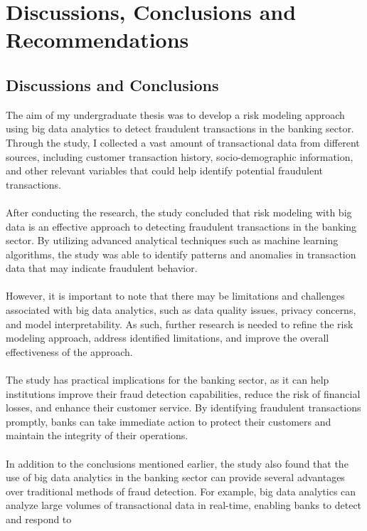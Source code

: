 \chapter{Discussions, Conclusions and Recommendations}

\section{Discussions and Conclusions}

The aim of my undergraduate thesis was to develop a risk modeling approach using big data analytics to detect 
fraudulent transactions in the banking sector. Through the study, I collected a vast amount of transactional data 
from different sources, including customer transaction history, socio-demographic information, and other relevant 
variables that could help identify potential fraudulent transactions.\\\\
After conducting the research, the study concluded that risk modeling with big data is an effective approach to 
detecting fraudulent transactions in the banking sector. By utilizing advanced analytical techniques such as 
machine learning algorithms, the study was able to identify patterns and anomalies in transaction data that may 
indicate fraudulent behavior.\\\\
However, it is important to note that there may be limitations and challenges associated with big data analytics, 
such as data quality issues, privacy concerns, and model interpretability. As such, further research is needed to 
refine the risk modeling approach, address identified limitations, and improve the overall effectiveness of the 
approach.\\\\
The study has practical implications for the banking sector, as it can help institutions improve their fraud 
detection capabilities, reduce the risk of financial losses, and enhance their customer service. By identifying 
fraudulent transactions promptly, banks can take immediate action to protect their customers and maintain the 
integrity of their operations.\\\\
In addition to the conclusions mentioned earlier, the study also found that the use of big data analytics in the 
banking sector can provide several advantages over traditional methods of fraud detection. For example, big data 
analytics can analyze large volumes of transactional data in real-time, enabling banks to detect and respond to 
